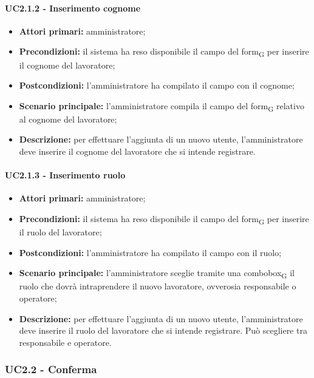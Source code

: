 \paragraph{UC2.1.2 - Inserimento cognome}

\begin{itemize}
	\item 	\textbf{Attori primari:} amministratore;
	\item 	\textbf{Precondizioni:} il sistema ha reso disponibile il campo del form\textsubscript{G} per inserire il cognome del lavoratore;
	\item 	\textbf{Postcondizioni:} l'amministratore ha compilato il campo con il cognome;
	\item 	\textbf{Scenario principale:} l'amministratore compila il campo del form\textsubscript{G} relativo al cognome del lavoratore;
	\item 	\textbf{Descrizione:} per effettuare l'aggiunta di un nuovo utente, l'amministratore deve inserire il cognome del lavoratore che si intende registrare.
	
\end{itemize}

\paragraph{UC2.1.3 - Inserimento ruolo}

\begin{itemize}
	\item 	\textbf{Attori primari:} amministratore;
	\item 	\textbf{Precondizioni:} il sistema ha reso disponibile il campo del form\textsubscript{G} per inserire il ruolo del lavoratore;
	\item 	\textbf{Postcondizioni:} l'amministratore ha compilato il campo con il ruolo;
	\item 	\textbf{Scenario principale:} l'amministratore sceglie tramite una combobox\textsubscript{G} il ruolo che dovrà intraprendere il nuovo lavoratore, ovverosia responsabile o operatore;
	\item 	\textbf{Descrizione:} per effettuare l'aggiunta di un nuovo utente, l'amministratore deve inserire il ruolo del lavoratore che si intende registrare. Può scegliere tra responsabile e operatore.
	
\end{itemize}


\subsubsection{UC2.2 - Conferma}


